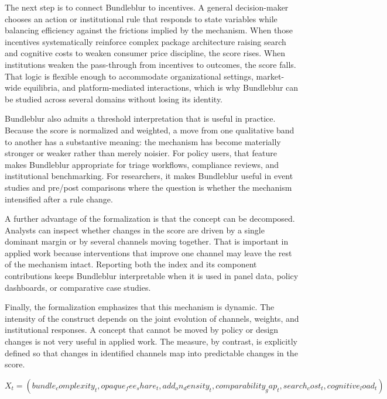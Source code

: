 \documentclass[12pt]{article}
\begin{document}
The next step is to connect Bundleblur to incentives. A general decision-maker chooses an action or institutional rule that responds to state variables while balancing efficiency against the frictions implied by the mechanism. When those incentives systematically reinforce complex package architecture raising search and cognitive costs to weaken consumer price discipline, the score rises. When institutions weaken the pass-through from incentives to outcomes, the score falls. That logic is flexible enough to accommodate organizational settings, market-wide equilibria, and platform-mediated interactions, which is why Bundleblur can be studied across several domains without losing its identity.

Bundleblur also admits a threshold interpretation that is useful in practice. Because the score is normalized and weighted, a move from one qualitative band to another has a substantive meaning: the mechanism has become materially stronger or weaker rather than merely noisier. For policy users, that feature makes Bundleblur appropriate for triage workflows, compliance reviews, and institutional benchmarking. For researchers, it makes Bundleblur useful in event studies and pre/post comparisons where the question is whether the mechanism intensified after a rule change.

A further advantage of the formalization is that the concept can be decomposed. Analysts can inspect whether changes in the score are driven by a single dominant margin or by several channels moving together. That is important in applied work because interventions that improve one channel may leave the rest of the mechanism intact. Reporting both the index and its component contributions keeps Bundleblur interpretable when it is used in panel data, policy dashboards, or comparative case studies.

Finally, the formalization emphasizes that this mechanism is dynamic. The intensity of the construct depends on the joint evolution of channels, weights, and institutional responses. A concept that cannot be moved by policy or design changes is not very useful in applied work. The measure, by contrast, is explicitly defined so that changes in identified channels map into predictable changes in the score.

\begin{equation}
X_t = (bundle_complexity_t, opaque_fee_share_t, add_on_density_t, comparability_gap_t, search_cost_t, cognitive_load_t)
\label{eq:channels}
\end{equation}
\end{document}
